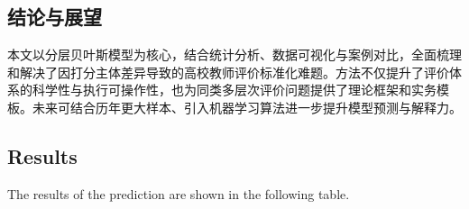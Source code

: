 \subsection{结论与展望}
本文以分层贝叶斯模型为核心，结合统计分析、数据可视化与案例对比，全面梳理和解决了因打分主体差异导致的高校教师评价标准化难题。方法不仅提升了评价体系的科学性与执行可操作性，也为同类多层次评价问题提供了理论框架和实务模板。未来可结合历年更大样本、引入机器学习算法进一步提升模型预测与解释力。

























\subsection{Results}

The results of the prediction are shown in the following table.

